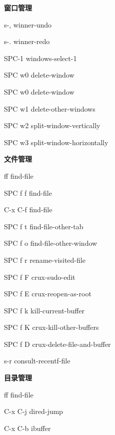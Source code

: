 \documentclass[10pt]{article}
\renewcommand\subsection[1]{\smallskip\par\textbf{\color{heading}#1}}
\begin{document}
\begin{CJK}{UTF8}{gbsn}
\begin{multicols}{3}
  \subsection{窗口管理}
  \begin{keylist}
  \item[s-,] winner-undo
  \item[s-.] winner-redo
  \item[SPC-1] windows-select-1
  \item[SPC w0] delete-window
  \item[SPC w0] delete-window
  \item[SPC w1] delete-other-windows
  \item[SPC w2] split-window-vertically
  \item[SPC w3] split-window-horizontally
  \end{keylist}

  \subsection{文件管理}
  \begin{keylist}
  \item[ff] find-file
  \item[SPC f f] find-file
  \item[C-x C-f] find-file
  \item[SPC f t] find-file-other-tab
  \item[SPC f o] find-file-other-window
  \item[SPC f r] rename-visited-file
  \item[SPC f F] crux-sudo-edit
  \item[SPC f E] crux-reopen-as-root
  \item[SPC f k] kill-current-buffer
  \item[SPC f K] crux-kill-other-buffers
  \item[SPC f D] crux-delete-file-and-buffer
  \item[s-r] consult-recentf-file
  \end{keylist}

  \subsection{目录管理}
  \begin{keylist}
  \item[ff] find-file
  \item[C-x C-j] dired-jump
  \item[C-x C-b] ibuffer
  \end{keylist}


\end{multicols}
\end{CJK}
\end{document}
